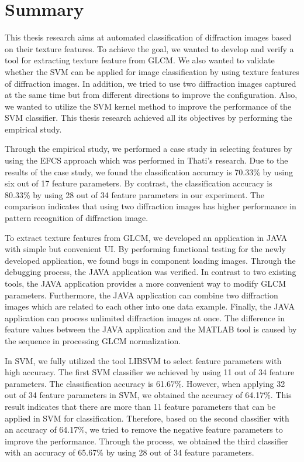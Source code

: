 
\renewcommand{\thechapter}{4}

\chapter{Summary}
This thesis research aims at automated classification of diffraction images based on their texture features. To achieve the goal, we wanted to develop and verify a tool for extracting texture feature from GLCM. We also wanted to validate whether the SVM can be applied for image classification by using texture features of diffraction images. In addition, we tried to use two diffraction images captured at the same time but from different directions to improve the configuration. Also, we wanted to utilize the SVM kernel method to improve the performance of the SVM classifier. This thesis research achieved all its objectives by performing the empirical study.\par
Through the empirical study, we performed a case study in selecting features by using the EFCS approach which was performed in Thati's research\cite{Thati}. Due to the results of the case study, we found the classification accuracy is 70.33\% by using six out of 17 feature parameters. By contrast, the classification accuracy is 80.33\% by using 28 out of 34 feature parameters in our experiment. The comparison indicates that using two diffraction images has higher performance in pattern recognition of diffraction image. \par
To extract texture features from GLCM, we developed an application in JAVA with simple but convenient UI. By performing functional testing for the newly developed application, we found bugs in component loading images. Through the debugging process, the JAVA application was verified. In contrast to two existing tools, the JAVA application provides a more convenient way to modify GLCM parameters. Furthermore, the JAVA application can combine two diffraction images which are related to each other into one data example. Finally, the JAVA application can process unlimited diffraction images at once. The difference in feature values between the JAVA application and the MATLAB tool is caused by the sequence in processing GLCM normalization. \par
 In SVM, we fully utilized the tool LIBSVM to select feature parameters with high accuracy. The first SVM classifier we achieved by using 11 out of 34 feature parameters. The classification accuracy is 61.67\%. However, when applying 32 out of 34 feature parameters in SVM, we obtained the accuracy of 64.17\%. This result indicates that there are more than 11 feature parameters that can be applied in SVM for classification. Therefore, based on the second classifier with an accuracy of 64.17\%, we tried to remove the negative feature parameters to improve the performance. Through the process, we obtained the third classifier with an accuracy of 65.67\% by using 28 out of 34 feature parameters. \par
